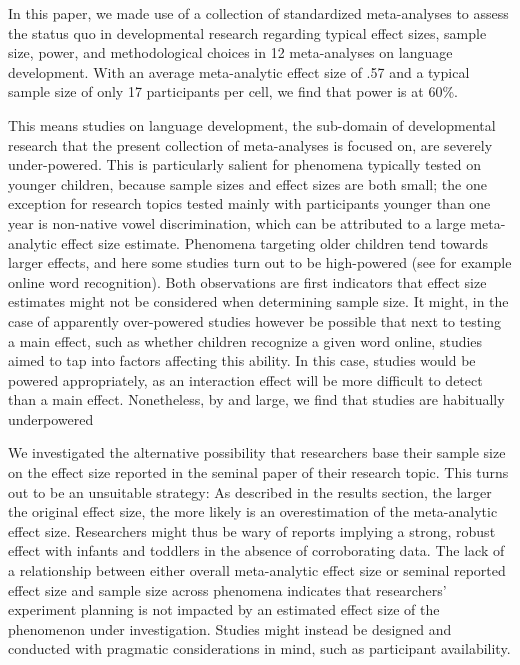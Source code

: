 \documentclass[english,floatsintext,man]{apa6}
\begin{document}
In this paper, we made use of a collection of standardized meta-analyses
to assess the status quo in developmental research regarding typical
effect sizes, sample size, power, and methodological choices in 12
meta-analyses on language development. With an average meta-analytic
effect size of .57 and a typical sample size of only 17 participants per
cell, we find that power is at 60\%.

This means studies on language development, the sub-domain of
developmental research that the present collection of meta-analyses is
focused on, are severely under-powered. This is particularly salient for
phenomena typically tested on younger children, because sample sizes and
effect sizes are both small; the one exception for research topics
tested mainly with participants younger than one year is non-native
vowel discrimination, which can be attributed to a large meta-analytic
effect size estimate. Phenomena targeting older children tend towards
larger effects, and here some studies turn out to be high-powered (see
for example online word recognition). Both observations are first
indicators that effect size estimates might not be considered when
determining sample size. It might, in the case of apparently
over-powered studies however be possible that next to testing a main
effect, such as whether children recognize a given word online, studies
aimed to tap into factors affecting this ability. In this case, studies
would be powered appropriately, as an interaction effect will be more
difficult to detect than a main effect. Nonetheless, by and large, we
find that studies are habitually underpowered

We investigated the alternative possibility that researchers base their
sample size on the effect size reported in the seminal paper of their
research topic. This turns out to be an unsuitable strategy: As
described in the results section, the larger the original effect size,
the more likely is an overestimation of the meta-analytic effect size.
Researchers might thus be wary of reports implying a strong, robust
effect with infants and toddlers in the absence of corroborating data.
The lack of a relationship between either overall meta-analytic effect
size or seminal reported effect size and sample size across phenomena
indicates that researchers' experiment planning is not impacted by an
estimated effect size of the phenomenon under investigation. Studies
might instead be designed and conducted with pragmatic considerations in
mind, such as participant availability.
\end{document}
